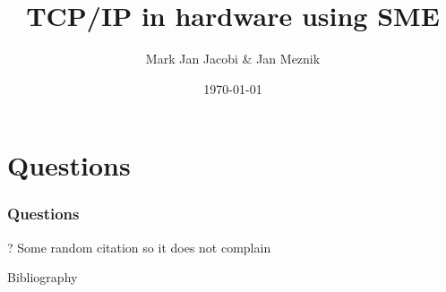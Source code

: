 \documentclass{beamer}
\title{TCP/IP in hardware using SME}
\author{Mark Jan Jacobi \& Jan Meznik}
\institute{KU}
\date{\today}
\begin{document}
\frame{\titlepage}

















\section{Questions}
\begin{frame}
  \frametitle{Questions}
  \begin{center}
    ?
	  Some random citation so it does not complain\cite{sco}
  \end{center}
\end{frame}

\begin{frame}{Bibliography}


\end{frame}



\end{document}
